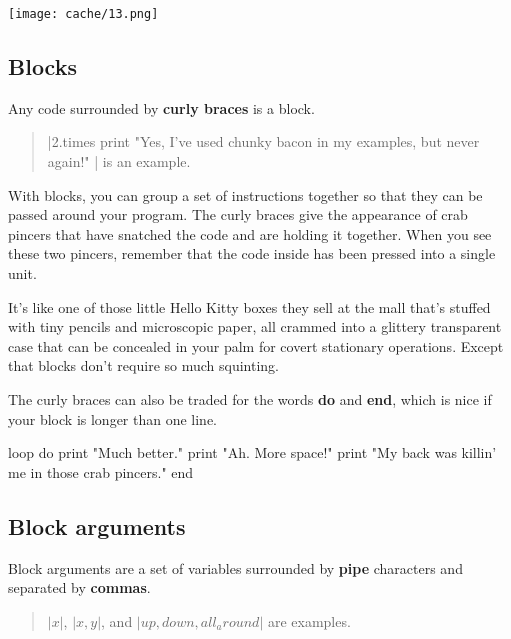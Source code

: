 \documentclass[12pt,twoside]{report}
\begin{document}
	\texttt{[image: cache/13.png]}




\subsection{Blocks}



Any code surrounded by {\bf curly braces} is a block.

\begin{quote}
\rubyinline|2.times { print "Yes, I've used chunky bacon in my examples, but never again!" }| is an example.\end{quote}


With blocks, you can group a set of instructions together so that they
can be passed around your program.  The curly braces give the
appearance of crab pincers that have snatched the code and are holding
it together.  When you see these two pincers, remember that the code
inside has been pressed into a single unit.

It's like one of those little Hello Kitty boxes they sell at the mall
that's stuffed with tiny pencils and microscopic paper, all crammed
into a glittery transparent case that can be concealed in your palm
for covert stationary operations.  Except that blocks don't require so
much squinting.

The curly braces can also be traded for the words {\bf do} and {\bf
  end}, which is nice if your block is longer than one line.

\begin{rubycode}

 loop do
   print "Much better."
   print "Ah.  More space!"
   print "My back was killin' me in those crab pincers."
 end

\end{rubycode}





\subsection{Block arguments}



Block arguments are a set of variables surrounded by {\bf pipe}
characters and separated by {\bf commas}.

\begin{quote}
\rubyinline$|x|$,
\rubyinline$|x,y|$, and
\rubyinline$|up, down, all_around|$ are
examples.\end{quote}
\end{document}
